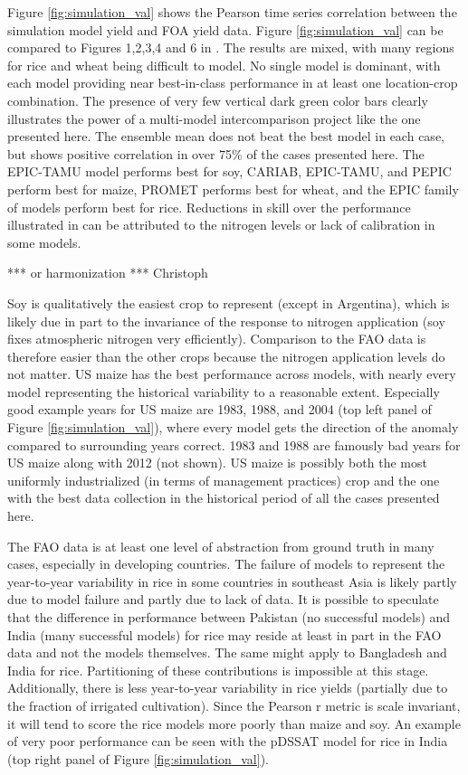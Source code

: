\documentclass[preprint, 5p, times, twocolumn]{elsarticle}
\begin{document}
{\color{blue} Figure \ref{fig:simulation_val} shows the Pearson time series correlation between the simulation model yield and FOA yield data. Figure \ref{fig:simulation_val} can be compared to Figures 1,2,3,4 and 6 in \citet{muller_global_2017}. The results are mixed, with many regions for rice and wheat being difficult to model. No single model is dominant, with each model providing near best-in-class performance in at least one location-crop combination. The presence of very few vertical dark green color bars clearly illustrates the power of a multi-model intercomparison project like the one presented here. The ensemble mean does not beat the best model in each case, but shows positive correlation in over 75\% of the cases presented here. The EPIC-TAMU model performs best for soy, CARIAB, EPIC-TAMU, and PEPIC perform best for maize, PROMET performs best for wheat, and the EPIC family of models perform best for rice. Reductions in skill over the performance illustrated in \citet{muller_global_2017} can be attributed to the nitrogen levels or lack of calibration in some models.

*** or harmonization *** Christoph

Soy is qualitatively the easiest crop to represent (except in Argentina), which is likely due in part to the invariance of the response to nitrogen application (soy fixes atmospheric nitrogen very efficiently). Comparison to the FAO data is therefore easier than the other crops because the nitrogen application levels do not matter. US maize has the best performance across models, with nearly every model representing the historical variability to a reasonable extent. Especially good example years for US maize are 1983, 1988, and 2004 (top left panel of Figure \ref{fig:simulation_val}), where every model gets the direction of the anomaly compared to surrounding years correct. 1983 and 1988 are famously bad years for US maize along with 2012 (not shown). US maize is possibly both the most uniformly industrialized (in terms of management practices) crop and the one with the best data collection in the historical period of all the cases presented here.

The FAO data is at least one level of abstraction from ground truth in many cases, especially in developing countries. The failure of models to represent the year-to-year variability in rice in some countries in southeast Asia is likely partly due to model failure and partly due to lack of data. It is possible to speculate that the difference in performance between Pakistan (no successful models) and India (many successful models) for rice may reside at least in part in the FAO data and not the models themselves. The same might apply to Bangladesh and India for rice. Partitioning of these contributions is impossible at this stage. Additionally, there is less year-to-year variability in rice yields (partially due to the fraction of irrigated cultivation). Since the Pearson r metric is scale invariant, it will tend to score the rice models more poorly than maize and soy. An example of very poor performance can be seen with the pDSSAT model for rice in India (top right panel of Figure \ref{fig:simulation_val}).}
\end{document}

